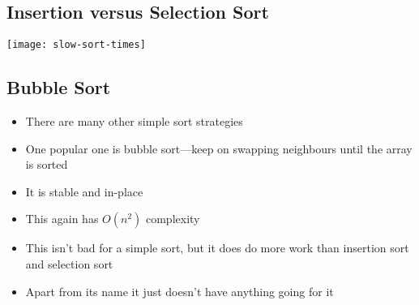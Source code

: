 
\begin{slide}
\section[-2]{Insertion versus Selection Sort}

\begin{center}
  \texttt{[image: slow-sort-times]}
\end{center}

\end{slide}



\begin{slide}
\section[-1]{Bubble Sort}

\begin{PauseHighLight}
  \begin{itemize}
  \item There are many other simple sort strategies\pause
  \item One popular one is bubble sort\pause---keep on swapping
    neighbours until the array is sorted\pause
  \item It is stable and in-place\pause
  \item This again has $O(n^2)$ complexity\pause
  \item This isn't bad for a simple sort, but it does do more work than
    insertion sort and selection sort\pause
  \item Apart from its name it just doesn't have anything going for
    it\pause
  \end{itemize}
\end{PauseHighLight}

\end{slide}


\Outline %

